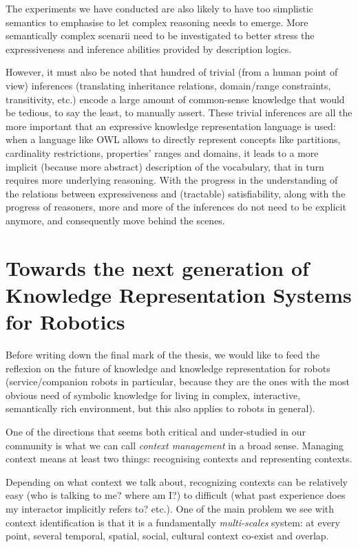 The experiments we have conducted are also likely to have too simplistic
semantics to emphasise to let complex reasoning needs to emerge. More
semantically complex scenarii need to be investigated to better stress the
expressiveness and inference abilities provided by description logics.

However, it must also be noted that hundred of trivial (from a human point of
view) inferences (translating inheritance relations, domain/range constraints,
transitivity, etc.) encode a large amount of common-sense knowledge that would
be tedious, to say the least, to manually assert. These trivial inferences are
all the more important that an expressive knowledge representation language is
used: when a language like OWL allows to directly represent concepts like
partitions, cardinality restrictions, properties' ranges and domains, it leads
to a more implicit (because more abstract) description of the vocabulary, that
in turn requires more underlying reasoning. With the progress in the
understanding of the relations between expressiveness and (tractable)
satisfiability, along with the progress of reasoners, more and more of the
inferences do not need to be explicit anymore, and consequently move behind the
scenes.

\section{Towards the next generation of Knowledge Representation Systems for Robotics}
\label{sect|perspectives}


Before writing down the final mark of the thesis, we would like to feed the
reflexion on the future of knowledge and knowledge representation for robots
(service/companion robots in particular, because they are the ones with the
most obvious need of symbolic knowledge for living in complex, interactive,
semantically rich environment, but this also applies to robots in general).

One of the directions that seems both critical and under-studied in our
community is what we can call \emph{context management} in a broad sense.
Managing context means at least two things: recognising contexts and
representing contexts.

Depending on what context we talk about, recognizing contexts can be relatively
easy (who is talking to me? where am I?) to difficult (what past experience
does my interactor implicitly refers to? etc.). One of the main problem we see
with context identification is that it is a fundamentally \emph{multi-scales}
system: at every point, several temporal, spatial, social, cultural context
co-exist and overlap.

